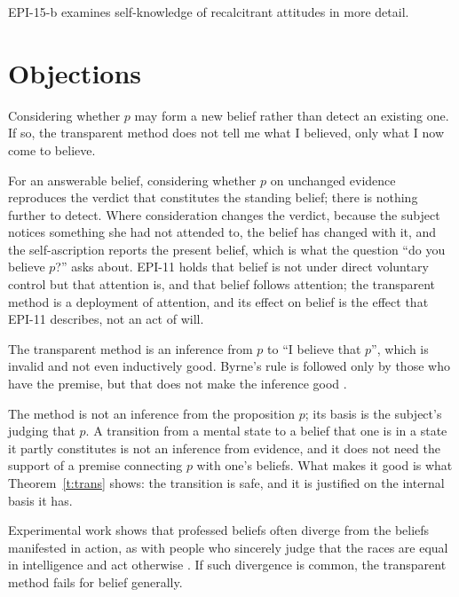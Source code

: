 \documentclass{situationist-preprint}
\begin{document}
EPI-15-b examines self-knowledge of recalcitrant attitudes in more detail.

\section{Objections}

\begin{objection}
Considering whether $p$ may form a new belief rather than detect an existing one. If so, the transparent method does not tell me what I believed, only what I now come to believe.
\end{objection}

\begin{reply}
For an answerable belief, considering whether $p$ on unchanged evidence reproduces the verdict that constitutes the standing belief; there is nothing further to detect. Where consideration changes the verdict, because the subject notices something she had not attended to, the belief has changed with it, and the self-ascription reports the present belief, which is what the question \enquote{do you believe $p$?} asks about. EPI-11 holds that belief is not under direct voluntary control but that attention is, and that belief follows attention; the transparent method is a deployment of attention, and its effect on belief is the effect that EPI-11 describes, not an act of will.
\end{reply}

\begin{objection}
The transparent method is an inference from $p$ to \enquote{I believe that $p$}, which is invalid and not even inductively good. Byrne's rule is followed only by those who have the premise, but that does not make the inference good \citep{Gertler2011}.
\end{objection}

\begin{reply}
The method is not an inference from the proposition $p$; its basis is the subject's judging that $p$. A transition from a mental state to a belief that one is in a state it partly constitutes is not an inference from evidence, and it does not need the support of a premise connecting $p$ with one's beliefs. What makes it good is what Theorem~\ref{t:trans} shows: the transition is safe, and it is justified on the internal basis it has.
\end{reply}

\begin{objection}
Experimental work shows that professed beliefs often diverge from the beliefs manifested in action, as with people who sincerely judge that the races are equal in intelligence and act otherwise \citep{Schwitzgebel2010}. If such divergence is common, the transparent method fails for belief generally.
\end{objection}
\end{document}
